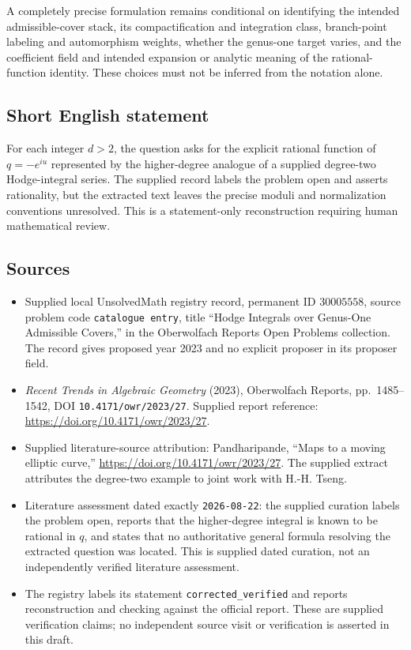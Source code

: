 \documentclass[11pt]{article}
\begin{document}
A completely precise formulation remains conditional on identifying the intended admissible-cover stack, its compactification and integration class, branch-point labeling and automorphism weights, whether the genus-one target varies, and the coefficient field and intended expansion or analytic meaning of the rational-function identity. These choices must not be inferred from the notation alone.
\subsection{Short English statement}
For each integer \(d>2\), the question asks for the explicit rational function of \(q=-e^{iu}\) represented by the higher-degree analogue of a supplied degree-two Hodge-integral series. The supplied record labels the problem open and asserts rationality, but the extracted text leaves the precise moduli and normalization conventions unresolved. This is a statement-only reconstruction requiring human mathematical review.
\subsection{Sources}
\begin{itemize}
\item Supplied local UnsolvedMath registry record, permanent ID \(30005558\), source problem code \texttt{catalogue entry}, title ``Hodge Integrals over Genus-One Admissible Covers,'' in the Oberwolfach Reports Open Problems collection. The record gives proposed year 2023 and no explicit proposer in its proposer field.
\item \emph{Recent Trends in Algebraic Geometry} (2023), Oberwolfach Reports, pp.~1485--1542, DOI \texttt{10.4171/owr/2023/27}. Supplied report reference: \url{https://doi.org/10.4171/owr/2023/27}.
\item Supplied literature-source attribution: Pandharipande, ``Maps to a moving elliptic curve,'' \url{https://doi.org/10.4171/owr/2023/27}. The supplied extract attributes the degree-two example to joint work with H.-H. Tseng.
\item Literature assessment dated exactly \texttt{2026-08-22}: the supplied curation labels the problem open, reports that the higher-degree integral is known to be rational in \(q\), and states that no authoritative general formula resolving the extracted question was located. This is supplied dated curation, not an independently verified literature assessment.
\item The registry labels its statement \texttt{corrected\_verified} and reports reconstruction and checking against the official report. These are supplied verification claims; no independent source visit or verification is asserted in this draft.
\end{itemize}
\end{document}
